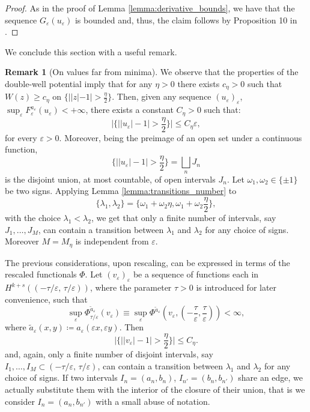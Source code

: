 \documentclass{article}
\theoremstyle{definition}
\newtheorem{Remark}[Theorem]{Remark}
\newcommand{\e}{\varepsilon}
\def\e{\varepsilon}
\begin{document}
\begin{proof}
    As in the proof of Lemma \ref{lemma:derivative_bounds}, we have that the sequence $G_\e(u_\e)$ is bounded and, thus, the claim follows by
    Proposition 10 in \cite{Solci_2024}.
\end{proof}

We conclude this section with a useful remark.
\begin{Remark}[On values far from minima]
\label{rmk:equibounded_intervals}
    We observe that the properties of the double-well potential imply that for any $\eta>0$ there exists $c_\eta>0$ such that $W(z) \geq c_\eta$ on $\{||z|-1|>\frac{\eta}{2}\}$. Then, given any  sequence $(u_\e)_\e$, 
    $\sup_\e F^{a_{\scriptstyle\e}}_{\e}(u_\e) <+\infty$, there exists a constant $C_\eta>0$ such that:
    \begin{equation*}
        \Big|\Big\{\big||u_\e|-1\big|>\frac{\eta}{2}\Big\}\Big|\leq C_\eta\e,
    \end{equation*}
    for every $\e>0$. Moreover, being the preimage of an open set under a continuous function,
    \begin{equation*}
        \Big\{\big||u_\e|-1\big|>\frac{\eta}{2}\Big\}=\bigsqcup_{n}J_n
    \end{equation*}
    is the disjoint union, at most countable, of open intervals $J_n$.
    Let $\omega_{1},\omega_{2}\in\{\pm 1\}$ be two signs. Applying Lemma \ref{lemma:transitions_number} to \[ \{\lambda_1,\lambda_2\}=\Big\{\omega_1+\omega_2\eta,\omega_1+\omega_2\frac{\eta}{2}\Big\},\] 
    with the choice $\lambda_1<\lambda_2$, we get that only a finite number of intervals, say $J_1, \ldots, J_M$, can contain a transition between $\lambda_1$ and $\lambda_2$ for any choice of signs. Moreover $M= M_\eta$ is independent from $\e$. 

    The previous considerations, upon rescaling, can be expressed in terms of the rescaled functionals $\Phi$. Let $(v_\e)_\e$ be a sequence of functions each in $H^{k+s}((-\tau/\e,\,\tau/\e ))$, where the parameter $  \tau>0$ is introduced  for later convenience, such that  
     \[\sup_\e\Phi^{\tilde a_{\scriptstyle\e}}_{\tau/\e}(v_\e)\equiv\sup_\e \Phi^{\tilde a_{\scriptstyle \e}} \left(v_\e, \left(-\frac{\tau}{\e},\frac{\tau}{\e}\right)\right)<\infty,\]
    where $\tilde a_\e(x,y)\coloneqq a_\e(\e x, \e y)$.  Then 
    \begin{equation}\label{eq:A_eta}
        \Big|\Big\{\big||v_\e|-1\big|>\frac{\eta}{2}\Big\}\Big|\leq C_\eta.
    \end{equation}
    and, again, only a finite number of disjoint intervals, say $ I_1, \ldots,  I_M\subset (-\tau/\e,\,\tau/\e)$, can contain a transition between $\lambda_1$ and $\lambda_2$ for any choice of signs. If two intervals $ I_n=(a_n,b_n)$, $ I_{n'}=(b_n,b_{n'})$ share an edge, we actually substitute them with the interior of the closure of their union, that is we consider $I_{n}= (a_n, b_{n'})$ with a small abuse of notation.
    

\end{Remark}
\end{document}
